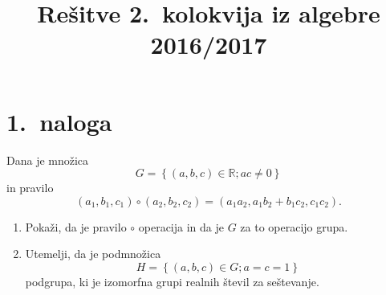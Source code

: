 \documentclass[a4,11pt]{article}
\title{Rešitve 2.~kolokvija iz algebre 2016/2017}
\author{}
\date{}
\newcommand{\R}{\mathbb{R}}
\begin{document}
\maketitle

\section*{1.~naloga}
    Dana je množica 
    \[G = \left\{\left(a, b, c\right) \in \R; ac \ne 0\right\}\]
    in pravilo 
    \[
        \left(a_1, b_1, c_1\right) \circ \left(a_2, b_2, c_2\right) = \left(a_1a_2, a_1b_2 + b_1c_2, c_1c_2\right).
    \]
    \begin{enumerate}[label=(\alph*)]
        \item Pokaži, da je pravilo \(\circ\) operacija in da je \(G\) za to operacijo grupa.
        \item Utemelji, da je podmnožica
            \[
                H = \left\{\left(a, b, c\right) \in G; a = c = 1\right\}
            \]
            podgrupa, ki je izomorfna grupi realnih števil za seštevanje.
    \end{enumerate}
\end{document}
